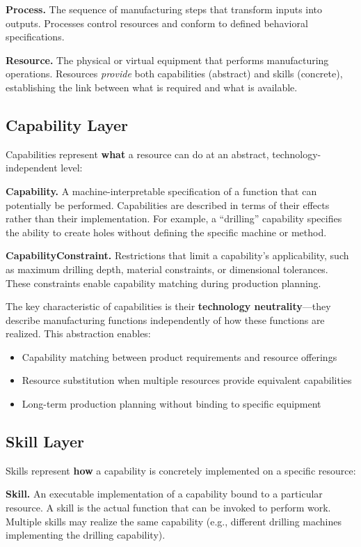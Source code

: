 \textbf{Process.} The sequence of manufacturing steps that transform inputs into outputs. Processes control resources and conform to defined behavioral specifications.

\textbf{Resource.} The physical or virtual equipment that performs manufacturing operations. Resources \textit{provide} both capabilities (abstract) and skills (concrete), establishing the link between what is required and what is available.

\subsection{Capability Layer}

Capabilities represent \textbf{what} a resource can do at an abstract, technology-independent level:

\textbf{Capability.} A machine-interpretable specification of a function that can potentially be performed. Capabilities are described in terms of their effects rather than their implementation. For example, a ``drilling'' capability specifies the ability to create holes without defining the specific machine or method.

\textbf{CapabilityConstraint.} Restrictions that limit a capability's applicability, such as maximum drilling depth, material constraints, or dimensional tolerances. These constraints enable capability matching during production planning.

The key characteristic of capabilities is their \textbf{technology neutrality}---they describe manufacturing functions independently of how these functions are realized. This abstraction enables:
\begin{itemize}
    \item Capability matching between product requirements and resource offerings
    \item Resource substitution when multiple resources provide equivalent capabilities
    \item Long-term production planning without binding to specific equipment
\end{itemize}

\subsection{Skill Layer}

Skills represent \textbf{how} a capability is concretely implemented on a specific resource:

\textbf{Skill.} An executable implementation of a capability bound to a particular resource. A skill is the actual function that can be invoked to perform work. Multiple skills may realize the same capability (e.g., different drilling machines implementing the drilling capability).

